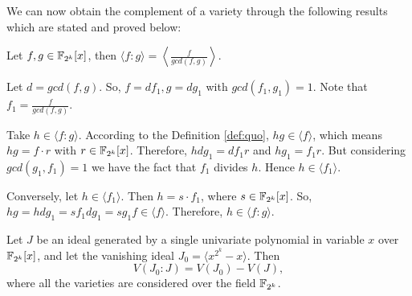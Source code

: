 We can now obtain the complement of a variety through the following
results which are stated and proved below:

\begin{Lemma}
\label{lem:gcd}
Let $f,g\in {\mathbb{F}}_{2^k}[x]$, then $\langle f:g\rangle = \left\langle\frac{f}{gcd(f,g)}\right\rangle$.
\end{Lemma}

\begin{Proof}
Let $d = gcd(f, g)$. So, $f = df_1 , g = dg_1$ with $gcd(f_1 , g_1 ) =
1$. Note that $f_1 = \frac{f}{gcd(f,g)}$.

Take $h \in \langle f : g\rangle$. According to the
Definition \ref{def:quo}, $hg \in \langle f \rangle$, which means $hg = f
\cdot r$ with $r \in {\mathbb{F}}_{2^k}[x]$. Therefore, $hdg_1 = df_1 r$ and $hg_1 =
f_1 r$. But considering $gcd(g_1 , f_1 ) = 1$ we have the fact that
$f_1$ divides $h$. Hence $h \in \langle f_1\rangle$.

Conversely, let $h \in \langle f_1 \rangle$. Then $h = s \cdot f_1$,
where $s \in {\mathbb{F}}_{2^k}[x]$. So, $hg = hdg_1 = sf_1 dg_1 = sg_1 f \in 
\langle f \rangle$. Therefore, $h \in \langle f : g\rangle$.
\end{Proof}


\begin{Theorem}
\label{thm:quotient}
Let $J$ be an ideal generated by a single univariate polynomial in
variable $x$ over ${\mathbb{F}}_{2^k}[x]$, and let the vanishing ideal $J_0 = \langle
x^{2^k}-x\rangle$. Then  
$${ V}(J_0:J) = { V}(J_0) - { V}(J),$$ where all the varieties are
considered over the field ${\mathbb{F}}_{2^k}$. 
\end{Theorem}

